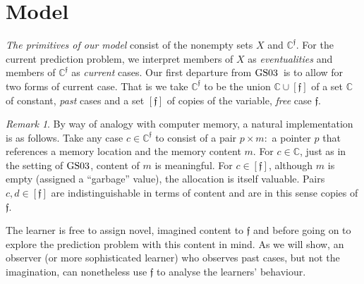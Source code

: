 \documentclass[ecta,nameyear,draft]{econsocart}
\newcommand{\novel}{\mathfrak f}
\newcommand{\mbbc}{{\mathds C}}
\newcommand{\mbbcp}{{\mathds C^{\novel}}}
\newcommand{\gsii}{$\textup{GS03}$}
\theoremstyle{plain}
\theoremstyle{remark}
\newtheorem*{remark*}{Remark}
\begin{document}
\section{Model}\label{sec-model}
\emph{The primitives of our model} consist of the nonempty sets
$X$ and $\mbbcp$.  For the current prediction problem, we interpret members of
$X$ as \emph{eventualities} and members of $\mbbcp$ as \emph{current} cases.
Our first departure from \gsii\ is to allow for two forms of current case. That
is we take $\mbbcp $ to be the union $\mbbc \cup [\novel]$ of a set $\mbbc$ of
constant, \emph{past} cases and a set $[\novel]$ of copies of the variable,
\emph{free} case $\novel$.
\begin{remark*}
  By way of analogy with computer memory, a natural implementation is as
  follows.  Take any case $c \in \mbbcp$ to consist of a pair $p \times m:$ a
  pointer $p$ that references a memory location and the memory content $m$. For
  $c\in \mbbc$, just as in the setting of \gsii, content of $m$ is meaningful. 
  For $c \in [\novel]$, although $m$ is empty (assigned a ``garbage'' value),
  the allocation is itself valuable. Pairs $c, d\in [\novel]$ are
  indistinguishable in terms of content and are in this sense copies of
  $\novel$.

  The learner is free to assign novel, imagined content to $\novel$ and before
  going on to explore the prediction problem with this content in mind.  As we
  will show, an observer (or more sophisticated learner) who observes past
  cases, but not the imagination, can nonetheless use $\novel$ to analyse the
  learners' behaviour.
\end{remark*}
\end{document}
